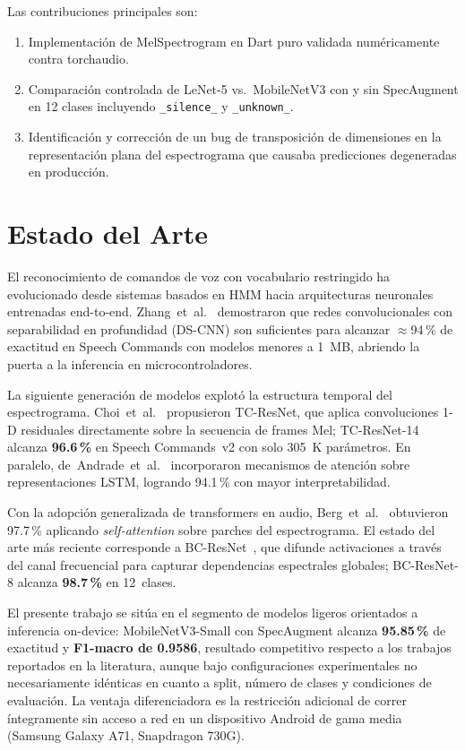 \documentclass[conference]{IEEEtran}
\begin{document}
Las contribuciones principales son:
\begin{enumerate}
  \item Implementación de MelSpectrogram en Dart puro validada numéricamente
        contra torchaudio.
  \item Comparación controlada de LeNet-5 vs.\ MobileNetV3 con y sin
        SpecAugment en 12 clases incluyendo \texttt{\_silence\_} y
        \texttt{\_unknown\_}.
  \item Identificación y corrección de un bug de transposición de dimensiones
        en la representación plana del espectrograma que causaba predicciones
        degeneradas en producción.
\end{enumerate}

\section{Estado del Arte}
\label{sec:sota}

El reconocimiento de comandos de voz con vocabulario restringido ha evolucionado
desde sistemas basados en HMM hacia arquitecturas neuronales entrenadas
end-to-end.  Zhang~et~al.~\cite{zhang2017hello} demostraron que redes
convolucionales con separabilidad en profundidad (DS-CNN) son suficientes para
alcanzar $\approx$94\,\% de exactitud en Speech Commands con modelos menores
a 1~MB, abriendo la puerta a la inferencia en microcontroladores.

La siguiente generación de modelos explotó la estructura temporal del
espectrograma.  Choi~et~al.~\cite{choi2019temporal} propusieron TC-ResNet,
que aplica convoluciones 1-D residuales directamente sobre la secuencia de
frames Mel; TC-ResNet-14 alcanza \textbf{96.6\,\%} en Speech Commands~v2 con
solo 305~K parámetros.  En paralelo, de~Andrade~et~al.~\cite{deandrade2018neural}
incorporaron mecanismos de atención sobre representaciones LSTM, logrando
94.1\,\% con mayor interpretabilidad.

Con la adopción generalizada de transformers en audio,
Berg~et~al.~\cite{berg2021keyword} obtuvieron 97.7\,\% aplicando
\textit{self-attention} sobre parches del espectrograma.  El estado del arte
más reciente corresponde a BC-ResNet~\cite{kim2021broadcasted}, que difunde
activaciones a través del canal frecuencial para capturar dependencias
espectrales globales; BC-ResNet-8 alcanza \textbf{98.7\,\%} en 12~clases.

El presente trabajo se sitúa en el segmento de modelos ligeros orientados a
inferencia on-device: MobileNetV3-Small con SpecAugment alcanza
\textbf{95.85\,\%} de exactitud y \textbf{F1-macro de 0.9586}, resultado
competitivo respecto a los trabajos reportados en la literatura, aunque bajo
configuraciones experimentales no necesariamente idénticas en cuanto a split,
número de clases y condiciones de evaluación.  La ventaja diferenciadora es
la restricción adicional de correr íntegramente sin acceso a red en un
dispositivo Android de gama media (Samsung Galaxy A71, Snapdragon 730G).
\end{document}

